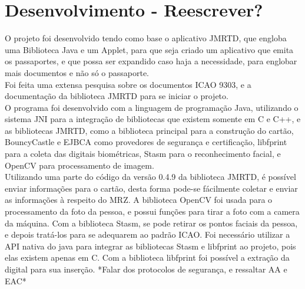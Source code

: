 \documentclass{article}
\begin{document}
	\section{Desenvolvimento - Reescrever? }
		\begin{justify}
			
		\hspace{2cm}O projeto foi desenvolvido tendo como base o aplicativo JMRTD\cite{JMRTD}, que engloba uma Biblioteca Java e um Applet, para que seja criado um aplicativo que emita os passaportes, e que possa ser expandido caso haja a necessidade, para englobar mais documentos e não só o passaporte.\\
		\hspace*{2cm}Foi feita uma extensa pesquisa sobre os documentos ICAO 9303\cite{ICAO}, e a documentação da biblioteca JMRTD para se iniciar o projeto.\\
		\hspace*{2cm}O programa foi desenvolvido com a linguagem de programação Java, utilizando o sistema JNI para a integração de bibliotecas que existem somente em C e C++, e as bibliotecas JMRTD, como a biblioteca principal para a construção do cartão, BouncyCastle\cite{BOUNCYCASTLE} e EJBCA\cite{EJBCA} como provedores de segurança e certificação, libfprint\cite{PRINT} para a coleta das digitais biométricas, Stasm\cite{STASM} para o reconhecimento facial, e OpenCV\cite{OPENCV} para processamento de imagem.\\
		\hspace*{2cm}Utilizando uma parte do código da versão 0.4.9 da biblioteca JMRTD, é possível enviar informações para o cartão, desta forma pode-se fácilmente coletar e enviar as informações à respeito do MRZ. A biblioteca OpenCV foi usada para o processamento da foto da pessoa, e possui funções para tirar a foto com a camera da máquina. Com a biblioteca Stasm, se pode retirar os pontos faciais da pessoa, e depois tratá-los para se adequarem ao padrão ICAO. Foi necessário utilizar a API nativa do java para integrar as bibliotecas Stasm e libfprint ao projeto, pois elas existem apenas em C. Com a biblioteca libfprint foi possível a extração da digital para sua inserção.
		\hspace*{2cm}*Falar dos protocolos de segurança, e ressaltar AA e EAC*


		\end{justify}
\end{document}
